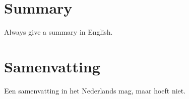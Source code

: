 \chapter*{Summary}
Always give a summary in English.

\chapter{Samenvatting}
Een samenvatting in het Nederlands mag, maar hoeft niet.